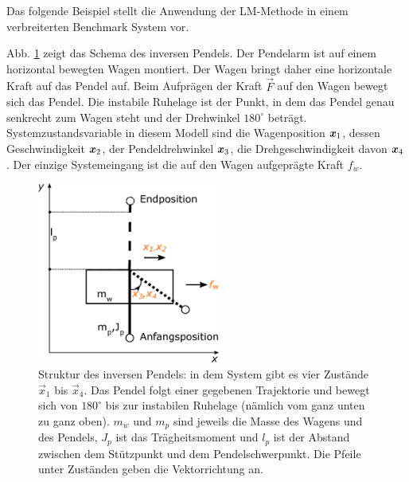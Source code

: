 Das folgende Beispiel stellt die Anwendung der LM-Methode in einem verbreiterten Benchmark System vor.

\begin{beispiel}
	Abb. \ref{fig:Inverses-Pendel} zeigt das Schema des inversen Pendels. Der Pendelarm ist auf einem horizontal bewegten Wagen montiert. Der Wagen bringt daher eine horizontale Kraft auf das Pendel auf. Beim Aufprägen der Kraft $\vec{F}$ auf den Wagen bewegt sich das Pendel. Die instabile Ruhelage ist der Punkt, in dem das Pendel genau senkrecht zum Wagen steht und der Drehwinkel $180^{\circ}$ beträgt. Systemzustandsvariable in diesem Modell sind die Wagenposition $\boldsymbol x_{1}$, dessen Geschwindigkeit $\boldsymbol x_{2}$, der Pendeldrehwinkel $\boldsymbol x_{3}$, die Drehgeschwindigkeit davon $\boldsymbol x_{4}$. Der einzige Systemeingang ist die auf den Wagen aufgeprägte Kraft $f_{w}$.
	\begin{figure}
		\centering
		\includegraphics[width=6cm]{bild/modul/Inverses-Pendel.eps}
		\caption{Struktur des inversen Pendels: in dem System gibt es vier Zustände $\vec{x}_{1}$ bis $\vec{x}_{4}$. Das Pendel folgt einer gegebenen Trajektorie und bewegt sich von $180^{\circ}$ bis zur instabilen Ruhelage (nämlich vom ganz unten zu ganz oben). $m_{w}$ und $m_{p}$ sind jeweils die Masse des Wagens und des Pendels, $J_{p}$ ist das Trägheitsmoment und $l_{p}$ ist der Abstand zwischen dem Stützpunkt und dem Pendelschwerpunkt. Die Pfeile unter Zuständen geben die Vektorrichtung an.}
		\label{fig:Inverses-Pendel}
	\end{figure}  


\end{beispiel}
